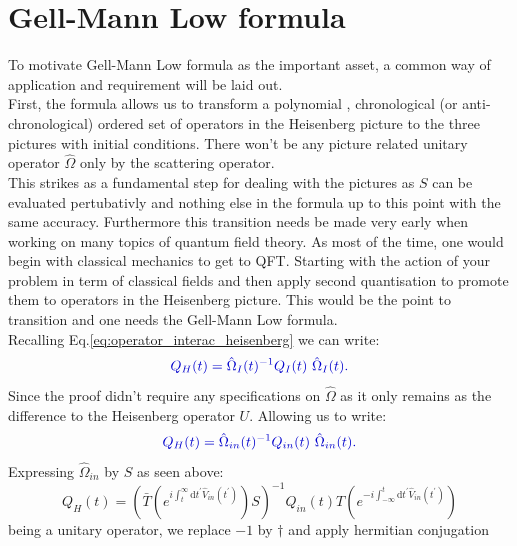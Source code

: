 \documentclass[12pt, titlepage]{article}
\begin{document}
\section{Gell-Mann Low formula}
%
To motivate Gell-Mann Low formula as the important asset, a common way of application and requirement will be laid out. \\
First, the formula allows us to transform a polynomial , chronological (or anti-chronological) ordered set of operators in the Heisenberg picture to  the three pictures with initial conditions. There won't be any picture related unitary operator $ \hat{\Omega} $ only by the scattering operator. \\
This strikes as a fundamental step for dealing with the pictures as $ S $ can be evaluated pertubativly and nothing else in the formula up to this point with the same accuracy. Furthermore this transition needs be made very early when working on many topics of quantum field theory. As most of the time, one would begin with classical mechanics to get to QFT. Starting with the action of your problem in term of classical fields and then apply second quantisation to promote them to operators in the Heisenberg picture. This would be the point to transition and one needs the Gell-Mann Low formula.\\
%
Recalling Eq.\enskip\eqref{eq:operator_interac_heisenberg} we can write:
\begin{equation}\textcolor[RGB]{0,0,204}{
Q_{H}(t)=\hat{\Omega}_{I}(t)^{-1}Q_{I}(t)\ \hat{\Omega}_{I}(t).
}
\end{equation}
Since the proof didn't require any specifications on $ \hat{\Omega} $ as it only remains as the difference to the Heisenberg operator $ U $. Allowing us to write:
\begin{equation}\textcolor[RGB]{0,0,204}{
Q_{H}(t)=\hat{\Omega}_{in}(t)^{-1}Q_{in}(t)\ \hat{\Omega}_{in}(t).
}
\end{equation}
Expressing $ \hat{\Omega}_{in} $ by $ S $ as seen above:
\begin{equation}
Q_{H}(t)
=\left( 
\bar{T}
\left( 
 e^{i\int_{t}^{\infty}\mathrm{d}t^{\prime} \hat{V}_{in}(t^{\prime})}
\right) 
S
\right)^{-1}
Q_{in}(t)
T
\left( 
 e^{-i\int_{-\infty}^{t}\mathrm{d}t^{\prime} \hat{V}_{in}(t^{\prime})}
\right) 
\end{equation}
being a unitary operator, we replace $ -1 $ by $ \dagger $ and apply hermitian conjugation
\end{document}
